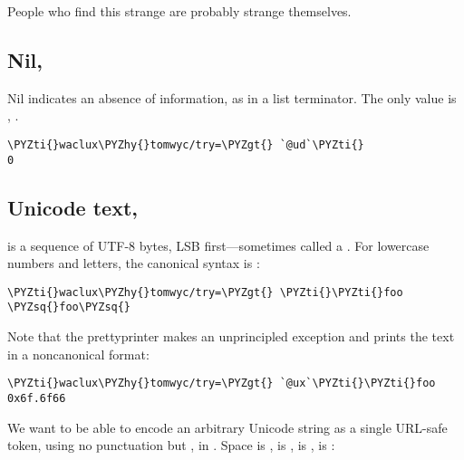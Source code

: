 People who find this strange are probably strange themselves.

\subsection{Nil, }

Nil indicates an absence of information, as in a list terminator.
The only value is \kode{\sig}, .

\begin{framed_shaded}
\begin{Verbatim}[fontsize=\relsize{-2.5},fontseries=b,commandchars=\\\{\}]
\PYZti{}waclux\PYZhy{}tomwyc/try=\PYZgt{} `@ud`\PYZti{}
0
\end{Verbatim}
\end{framed_shaded}

\subsection{Unicode text, }

 is a sequence of UTF-8 bytes, LSB first---sometimes called a
.  For lowercase numbers and letters, the canonical syntax
is :

\begin{framed_shaded}
\begin{Verbatim}[fontsize=\relsize{-2.5},fontseries=b,commandchars=\\\{\}]
\PYZti{}waclux\PYZhy{}tomwyc/try=\PYZgt{} \PYZti{}\PYZti{}foo
\PYZsq{}foo\PYZsq{}
\end{Verbatim}
\end{framed_shaded}

Note that the prettyprinter makes an unprincipled exception and
prints the text in a noncanonical format:

\begin{framed_shaded}
\begin{Verbatim}[fontsize=\relsize{-2.5},fontseries=b,commandchars=\\\{\}]
\PYZti{}waclux\PYZhy{}tomwyc/try=\PYZgt{} `@ux`\PYZti{}\PYZti{}foo
0x6f.6f66
\end{Verbatim}
\end{framed_shaded}

We want to be able to encode an arbitrary Unicode string as a
single URL-safe token, using no punctuation but , in .
Space is ,  is , \kode{\sig} is \kode{\sig\sig}, \kode{-} is \kode{-}:

